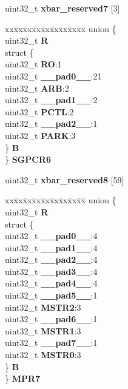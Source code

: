 \begin{DoxyCompactItemize}
\begin{tabbing}
\end{tabbing}\item 
\mbox{\label{structXBAR__tag_afdc648f1db864ac3d9fb8d1f07e9a6aa}} 
uint32\+\_\+t {\bfseries xbar\+\_\+reserved7} \mbox{[}3\mbox{]}
\item 
\mbox{\label{structXBAR__tag_a08e8137a0d880dae81bc8a1872f3fea3}} 
\begin{tabbing}
xx\=xx\=xx\=xx\=xx\=xx\=xx\=xx\=xx\=\kill
union \{\\
\>uint32\_t {\bfseries R}\\
\>struct \{\\
\>\>uint32\_t {\bfseries RO}:1\\
\>\>uint32\_t {\bfseries \_\_pad0\_\_}:21\\
\>\>uint32\_t {\bfseries ARB}:2\\
\>\>uint32\_t {\bfseries \_\_pad1\_\_}:2\\
\>\>uint32\_t {\bfseries PCTL}:2\\
\>\>uint32\_t {\bfseries \_\_pad2\_\_}:1\\
\>\>uint32\_t {\bfseries PARK}:3\\
\>\} {\bfseries B}\\
\} {\bfseries SGPCR6}\\

\end{tabbing}\item 
\mbox{\label{structXBAR__tag_a18ee4d51c80c45c9cb46f1c2eea06230}} 
uint32\+\_\+t {\bfseries xbar\+\_\+reserved8} \mbox{[}59\mbox{]}
\item 
\mbox{\label{structXBAR__tag_a5ffc550f66eacb9fb9b4ee90be5d3b03}} 
\begin{tabbing}
xx\=xx\=xx\=xx\=xx\=xx\=xx\=xx\=xx\=\kill
union \{\\
\>uint32\_t {\bfseries R}\\
\>struct \{\\
\>\>uint32\_t {\bfseries \_\_pad0\_\_}:4\\
\>\>uint32\_t {\bfseries \_\_pad1\_\_}:4\\
\>\>uint32\_t {\bfseries \_\_pad2\_\_}:4\\
\>\>uint32\_t {\bfseries \_\_pad3\_\_}:4\\
\>\>uint32\_t {\bfseries \_\_pad4\_\_}:4\\
\>\>uint32\_t {\bfseries \_\_pad5\_\_}:1\\
\>\>uint32\_t {\bfseries MSTR2}:3\\
\>\>uint32\_t {\bfseries \_\_pad6\_\_}:1\\
\>\>uint32\_t {\bfseries MSTR1}:3\\
\>\>uint32\_t {\bfseries \_\_pad7\_\_}:1\\
\>\>uint32\_t {\bfseries MSTR0}:3\\
\>\} {\bfseries B}\\
\} {\bfseries MPR7}\\


\end{tabbing}
\end{DoxyCompactItemize}
